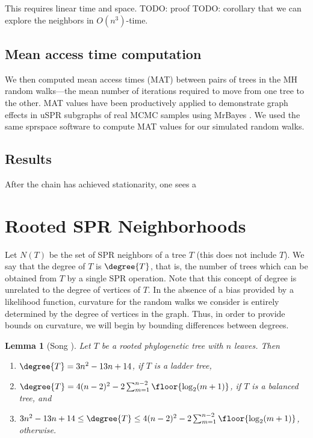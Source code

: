 \documentclass{amsart}
\newtheorem{lemma}[theorem]{Lemma}
\begin{document}
This requires linear time and space.
TODO: proof
TODO: corollary that we can explore the neighbors in $O(n^3)$-time.


\subsection{Mean access time computation}

We then computed mean access times (MAT) between pairs of trees in the MH random walks---the mean number of iterations required to move from one tree to the other. 
MAT values have been productively applied to demonstrate graph effects in uSPR subgraphs of real MCMC samples using MrBayes . 
We used the same sprspace software to compute MAT values for our simulated random walks.

\subsection{Results}

After the chain has achieved stationarity, one sees a


\section{Rooted SPR Neighborhoods}

Let $N(T)$ be the set of SPR neighbors of a tree $T$ (this does not include $T$).
We say that the degree of $T$ is $\degree{T}$, that is, the number of trees which can be obtained from $T$ by a single SPR operation.
Note that this concept of degree is unrelated to the degree of vertices of $T$.
In the absence of a bias provided by a likelihood function, curvature for the random walks we consider is entirely determined by the degree of vertices in the graph.
Thus, in order to provide bounds on curvature, we will begin by bounding differences between degrees.

\begin{lemma}[{Song \cite{Song2003-gf}}]
    \pushQED{\qed}
	\label{lem:degree_extremes}
	Let $T$ be a rooted phylogenetic tree with $n$ leaves. Then
	\begin{enumerate}
		\item $\degree{T} = 3n^2 - 13n + 14$, if $T$ is a ladder tree,
		\item $\degree{T} = 4(n-2)^2 - 2 \sum_{m=1}^{n-2} \floor{\log_2(m+1)}$, if $T$ is a balanced tree, and
		\item  $3n^2 - 13n + 14 \le \degree{T} \le 4(n-2)^2 - 2 \sum_{m=1}^{n-2} \floor{\log_2(m+1)}$, otherwise.
	\end{enumerate}
    \popQED
\end{lemma}
\end{document}
